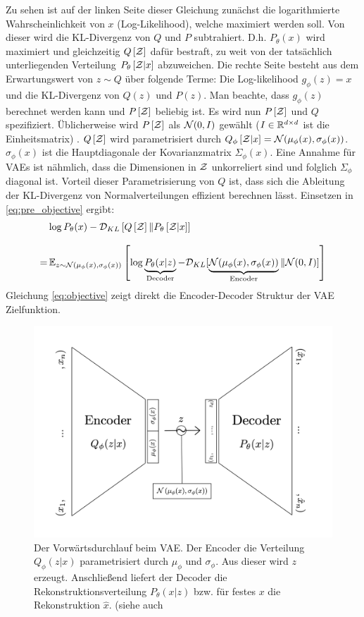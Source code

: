 Zu sehen ist auf der linken Seite dieser Gleichung zunächst die logarithmierte Wahrscheinlichkeit von $x$ (Log-Likelihood), welche maximiert werden soll. Von dieser wird die KL-Divergenz von $Q$ und $P$ subtrahiert. D.h. $P_\theta(x)$ wird maximiert und gleichzeitig $Q\left[ \mathcal{Z} \right]$ dafür bestraft, zu weit von der tatsächlich unterliegenden Verteilung $P_\theta\left[ \mathcal{Z} \vert x\right]$ abzuweichen. Die rechte Seite besteht aus dem Erwartungswert von $z \sim Q$ über folgende Terme: Die Log-likelihood $g_\phi(z) = x$ und die KL-Divergenz von $Q(z)$ und $P(z)$. Man beachte, dass $g_\phi(z)$ berechnet werden kann und $P\left[ \mathcal{Z} \right]$ beliebig ist. Es wird nun $P\left[ \mathcal{Z} \right]$ und $Q$ spezifiziert. Üblicherweise wird $P\left[ \mathcal{Z} \right]$ als $\mathcal{N}(0, I)$ gewählt ($I \in \mathbb{R}^{d \times d}$ ist die Einheitsmatrix) . $Q\left[ \mathcal{Z} \right]$ wird parametrisiert durch $Q_\phi\left[ \mathcal{Z} \vert x \right] = \mathcal{N}(\mu_\phi(x), \sigma_\phi(x))$. $\sigma_\phi(x)$ ist die Hauptdiagonale der Kovarianzmatrix $\Sigma_\phi(x)$. Eine Annahme für VAEs ist nähmlich, dass die Dimensionen in $\mathcal{Z}$ unkorreliert sind und folglich $\Sigma_\phi$ diagonal ist. Vorteil dieser Parametrisierung von $Q$ ist, dass sich die Ableitung der KL-Divergenz von Normalverteilungen effizient berechnen lässt. Einsetzen in \ref{eq:pre_objective} ergibt:
\begin{align}\label{eq:objective}
  &\log P_\theta(x) - \mathcal{D}_{KL}\left[ Q\left[ \mathcal{Z} \right] \| P_\theta\left[ \mathcal{Z} \vert x\right] \right] \notag\\[8pt]
  =& \, \mathbb{E}_{z \sim \mathcal{N}(\mu_\phi(x), \sigma_\phi(x))}\left[ \log \underbrace{P_\theta(x \vert z)}_\text{Decoder} - \mathcal{D}_{KL}[\underbrace{\mathcal{N}(\mu_\phi(x), \sigma_\phi(x))}_\text{Encoder} \| \mathcal{N}(0, I)] \right]
\end{align}
Gleichung \ref{eq:objective} zeigt direkt die Encoder-Decoder Struktur der VAE Zielfunktion.
\begin{figure}[hbt]
  \centering
  \includegraphics[width=.7\textwidth]{gfx/literature/forward_pass}
  \caption{Der Vorwärtsdurchlauf beim VAE. Der Encoder die Verteilung $Q_\phi(z \vert x)$ parametrisiert durch $\mu_\phi$ und $\sigma_\phi$. Aus dieser wird $z$ erzeugt. Anschließend liefert der Decoder die Rekonstruktionsverteilung $P_\theta(x \vert z)$ bzw. für festes $x$ die Rekonstruktion $\hat{x}$. (siehe auch \cite{Doersch2016}}
  \label{fig:enc-dec}
\end{figure}


